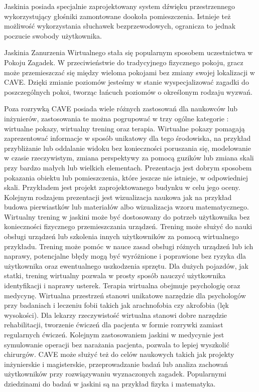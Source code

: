 Jaskinia posiada specjalnie zaprojektowany system dźwięku przestrzennego wykorzystujący głośniki zamontowane dookoła pomieszczenia. Istnieje też możliwość wykorzystania słuchawek bezprzewodowych, ogranicza to jednak poczucie swobody użytkownika.

Jaskinia Zanurzenia Wirtualnego stała się popularnym sposobem uczestnictwa w Pokoju Zagadek. W przeciwieństwie do tradycyjnego fizycznego pokoju, gracz może przemieszczać się między wieloma pokojami bez zmiany swojej lokalizacji w CAVE. Dzięki zmianie poziomów jesteśmy w stanie wyspecjalizować zagadki do poszczególnych pokoi, tworząc łańcuch poziomów o określonym rodzaju wyzwań.

Poza rozrywką CAVE posiada wiele różnych zastosowań dla naukowców lub inżynierów, zastosowania te można pogrupować w trzy ogólne kategorie : wirtualne pokazy, wirtualny trening oraz terapia.
Wirtualne pokazy pomagają zaprezentować informacje w sposób unikatowy dla tego środowiska, na przykład przybliżanie lub oddalanie widoku bez konieczności poruszania się, modelowanie w czasie rzeczywistym, zmiana perspektywy za pomocą guzików lub zmiana skali przy bardzo małych lub wielkich elementach.
Prezentacja jest dobrym sposobem pokazania obiektu lub pomieszczenia, które jeszcze nie istnieje, w odpowiedniej skali. Przykładem jest projekt zaprojektowanego budynku w celu jego oceny. Kolejnym rodzajem prezentacji jest wizualizacja naukowa jak na przykład budowa pierwiastków lub materiałów albo wizualizacja wzoru matematycznego.
Wirtualny trening w jaskini może być dostosowany do potrzeb użytkownika bez konieczności fizycznego przemieszczania urządzeń. Trening może służyć do nauki obsługi urządzeń lub szkolenia innych użytkowników za pomocą wirtualnego przykładu.
Trening może pomóc w nauce zasad obsługi różnych urządzeń lub ich naprawy, potencjalne błędy mogą być wyróżnione i poprawione bez ryzyka dla użytkownika oraz ewentualnego uszkodzenia sprzętu. Dla dużych pojazdów, jak statki, trening wirtualny pozwala w prosty sposób nauczyć użytkownika identyfikacji i naprawy usterek.
Terapia wirtualna obejmuje psychologię oraz medycynę. Wirtualna przestrzeń stanowi unikatowe narzędzie dla psychologów przy badaniach i leczeniu fobii takich jak arachnofobia czy akrofobia (lęk wysokości). Dla lekarzy rzeczywistość wirtualna stanowi dobre narzędzie rehabilitacji, tworzenie ćwiczeń dla pacjenta w formie rozrywki zamiast regularnych ćwiczeń. Kolejnym zastosowaniem jaskini w medycynie jest symulowanie operacji bez narażania pacjenta, pozwala to lepiej wyszkolić chirurgów.
CAVE może służyć też do celów naukowych takich jak projekty inżynierskie i magisterskie, przeprowadzanie badań lub analiza zachowań użytkowników przy rozwiązywaniu wyznaczonych zagadek.
Popularnymi dziedzinami do badań w jaskini są na przykład fizyka i matematyka. 

